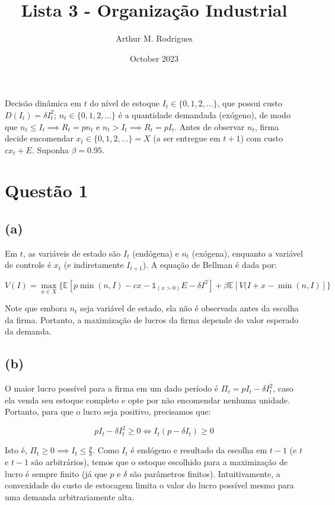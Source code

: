 \documentclass{article}
\title{Lista 3 - Organização Industrial}
\author{Arthur M. Rodrigues}
\date{October 2023}
\begin{document}
\maketitle

Decisão dinâmica em $t$ do nível de estoque $I_t \in \{ 0, 1, 2, ...\}$, que possui custo $D(I_t) = \delta I_t^2$; $n_t \in \{0, 1, 2, ...\}$ é a quantidade demandada (exógeno), de modo que $n_t \leq I_t \implies R_t = pn_t$ e $n_t > I_t \implies R_t = pI_t$. Antes de observar $n_t$, firma decide encomendar $x_t \in \{0, 1, 2, ...\} = X$ (a ser entregue em $t+1$) com custo $cx_t + E$. Suponha $\beta = 0.95$.

\section*{Questão 1}

\subsection*{(a)}

Em $t$, as variáveis de estado são $I_t$ (endógena) e $n_t$ (exógena), enquanto a variável de controle é $x_t$ (e indiretamente $I_{t+1}$). A equação de Bellman é dada por:

\begin{equation}
    V(I) = \max_{x\in X} \{\mathbb{E}[ p\min(n,I) - cx - \mathds{1}_{(x>0)}E - \delta I^2] + \beta \mathbb{E}[V(I+x-\min(n,I)]\}
\end{equation}%

Note que embora $n_t$ seja variável de estado, ela não é observada antes da escolha da firma. Portanto, a maximização de lucros da firma depende do valor esperado da demanda.

\subsection*{(b)}

O maior lucro possível para a firma em um dado período é $\Pi_t = pI_t - \delta I_t^2$, caso ela venda seu estoque completo e opte por não encomendar nenhuma unidade. Portanto, para que o lucro seja positivo, precisamos que:

\begin{equation*}
    pI_t - \delta I_t^2 \geq 0 \iff I_t(p - \delta I_t) \geq 0
\end{equation*}

Isto é, $\Pi_t \geq 0 \implies I_t \leq \frac{p}{\delta}$. Como $I_t$ é endógeno e resultado da escolha em $t-1$ (e $t$ e $t-1$ são arbitrários), temos que o estoque escolhido para a maximização de lucro é sempre finito (já que $p$ e $\delta$ são parâmetros finitos). Intuitivamente, a convexidade do custo de estocagem limita o valor do lucro possível mesmo para uma demanda arbitrariamente alta.
\end{document}
